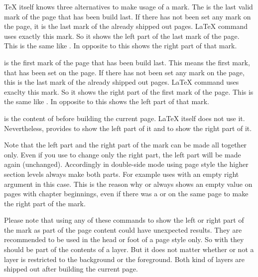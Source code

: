   \TeX{} itself knows three alternatives to make usage of a mark. The
   is the last valid mark of the page that has been build
  last. If there has not been set any mark on the page, it is the last mark of
  the already shipped out pages. \LaTeX{} command
   uses exactly this mark. So it shows the left
  part of the last mark of the page. This is the same like
  . In opposite to this  shows the
  right part of that mark.

   is the first mark of the page that has been build
  last. This means the first mark, that has been set on the page. If there has
  not been set any mark on the page, this is the last mark of the already
  shipped out pages. \LaTeX{} command  uses
  exaclty this mark. So it shows the right part of the first mark of the
  page. This is the same like . In opposite to this
   shows the left part of that mark.

   is the content of  before building the
  current page. \LaTeX{} itself does not use it. Nevertheless,
   provides  to show the left part of it
  and  to show the right part of it.

  Note that the left part and the right part of the mark
  can be made all together only. Even if you use
   to change only the
  right part, the left part will be made again (unchanged). Accordingly in
  double-side mode using page style
  the higher section levels always make both parts. For example
   uses  with
  an empty right argument in this case. This is the reason why
   or  always shows an
  empty value on pages with chapter beginnings, even if there was a
   or  on the
  same page to make the right part of the mark.

  Please note that using any of these commands to show
  the left or right part of the mark as part of the page content could have
  unexpected results. They are recommended to be used in the head or foot of a
  page style only. So with  they should be part of the
  contents of a layer. But it does not matter whether or not a layer is
  restricted to the background or the foreground. Both kind of layers are
  shipped out after building the current page.

